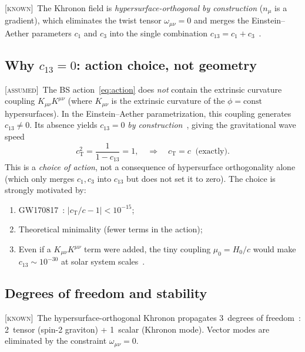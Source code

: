 \documentclass[prd,twocolumn,superscriptaddress,longbibliography,floatfix]{revtex4-2}
\newcommand{\cT}{c_{\mathrm{T}}}
\newcommand{\known}{\textsc{[known]}}
\newcommand{\assumed}{\textsc{[assumed]}}
\begin{document}
\known\  The Khronon field is \emph{hypersurface-orthogonal by
construction} ($n_\mu$ is a gradient), which eliminates the twist
tensor $\omega_{\mu\nu} = 0$ and merges the Einstein--Aether
parameters $c_1$ and $c_3$ into the single combination
$c_{13} = c_1 + c_3$~\cite{Jacobson2010,BPS2010,Horava2009}.

\subsection{Why $c_{13} = 0$: action choice, not geometry}
\label{sec:c13}

\assumed\  The BS action~\eqref{eq:action} does \emph{not} contain
the extrinsic curvature coupling $K_{\mu\nu}K^{\mu\nu}$ (where
$K_{\mu\nu}$ is the extrinsic curvature of the $\phi = \mathrm{const}$
hypersurfaces).  In the Einstein--Aether parametrization, this
coupling generates $c_{13} \neq 0$.  Its absence yields
$c_{13} = 0$ \emph{by construction}~\cite{BS2024}, giving the
gravitational wave speed
\begin{equation}
\cT^2 = \frac{1}{1 - c_{13}} = 1,
\quad\Longrightarrow\quad \cT = c \;\;\text{(exactly)}.
\label{eq:cT}
\end{equation}
This is a \emph{choice of action}, not a consequence of hypersurface
orthogonality alone (which only merges $c_1, c_3$ into $c_{13}$ but
does not set it to zero).  The choice is strongly motivated by:
\begin{enumerate}
\item GW170817~\cite{GW170817}: $|c_{\mathrm{T}}/c - 1| < 10^{-15}$;
\item Theoretical minimality (fewer terms in the action);
\item Even if a $K_{\mu\nu}K^{\mu\nu}$ term were added, the tiny
  coupling $\mu_0 = H_0/c$ would make $c_{13} \sim 10^{-30}$ at
  solar system scales~\cite{OostMW2018}.
\end{enumerate}

\subsection{Degrees of freedom and stability}
\label{sec:stability}

\known\  The hypersurface-orthogonal Khronon propagates 3~degrees
of freedom~\cite{BPS2010}: 2~tensor (spin-2 graviton) + 1~scalar
(Khronon mode).  Vector modes are eliminated by the constraint
$\omega_{\mu\nu} = 0$.
\end{document}
